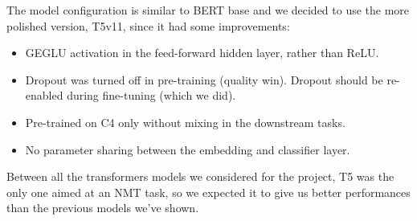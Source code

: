 The model configuration is similar to BERT base and we decided to use the more polished version, T5v11, since it had some improvements:
\begin{itemize}
    \item GEGLU activation in the feed-forward hidden layer, rather than ReLU.
    \item Dropout was turned off in pre-training (quality win). Dropout should be re-enabled during fine-tuning (which we did).
    \item Pre-trained on C4 only without mixing in the downstream tasks.
    \item No parameter sharing between the embedding and classifier layer.
\end{itemize}
Between all the transformers models we considered for the project, T5 was the only one aimed at an NMT task, so we expected it to give us better performances than the previous models we've shown.